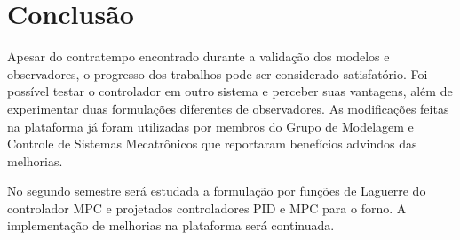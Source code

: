 
\chapter{Conclusão}%
\label{chp:conclusion}

Apesar do contratempo encontrado durante a validação dos modelos e observadores,
o progresso dos trabalhos pode ser considerado satisfatório. Foi possível testar
o controlador em outro sistema e perceber suas vantagens, além de experimentar
duas formulações diferentes de observadores. As modificações feitas na
plataforma já foram utilizadas por membros do Grupo de Modelagem e Controle de
Sistemas Mecatrônicos que reportaram benefícios advindos das melhorias.

No segundo semestre será estudada a formulação por funções de Laguerre do
controlador \ac{MPC} e projetados controladores PID e \ac{MPC} para o forno. A
implementação de melhorias na plataforma será continuada.
